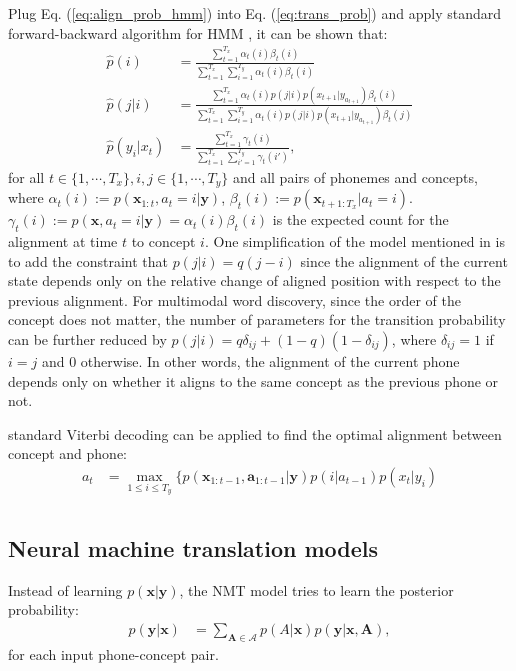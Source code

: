 \documentclass[journal]{IEEEtran}
\begin{document}
Plug Eq. (\ref{eq:align_prob_hmm}) into Eq. (\ref{eq:trans_prob}) and apply standard forward-backward algorithm for HMM \cite{Rabiner89-ATO}, it can be shown that:
\begin{align}
\label{eq:dhmm_em_update}
    \hat p(i) &= \frac{\sum_{t=1}^{T_x}\alpha_t(i)\beta_t(i)}{\sum_{t=1}^{T_x}\sum_{i=1}^{T_y}\alpha_t(i)\beta_t(i)}\\
    \hat p(j|i) &=  \frac{\sum_{t=1}^{T_x}\alpha_t(i)p(j|i)p(x_{t+1}|y_{a_{t+1}})\beta_t(i)}{\sum_{t=1}^{T_x}\sum_{i=1}^{T_y}\alpha_t(i)p(j|i)p(x_{t+1}|y_{a_{t+1}})\beta_t(j)}\\
    \hat p(y_i| x_t) &= \frac{\sum_{t=1}^{T_x}\gamma_t(i)}{\sum_{t=1}^{T_x}\sum_{i'=1}^{T_y}\gamma_t(i')},
\end{align}
for all $t \in \{1, \cdots, T_x\}, i, j \in \{1, \cdots, T_y\}$ and all pairs of phonemes and concepts, where $\alpha_t(i) := p(\mathbf x_{1:t}, a_t=i|\mathbf y)$, $\beta_t(i) := p(\mathbf x_{t+1:T_x}| a_t=i)$. $\gamma_t(i) := p(\mathbf x, a_t=i|\mathbf y) = \alpha_t(i) \beta_t(i)$ is the expected count for the alignment at time $t$ to concept $i$. One simplification of the model mentioned in \cite{Vogel1996} is to add the constraint that $p(j|i) = q(j-i)$ since the alignment of the current state depends only on the relative change of aligned position with respect to the previous alignment. For multimodal word discovery, since the order of the concept does not matter, the number of parameters for the transition probability can be further reduced by $p(j|i) = q \delta_{ij} + (1-q)(1-\delta_{ij})$, where $\delta_{ij} = 1$ if $i=j$ and 0 otherwise. In other words, the alignment of the current phone depends only on whether it aligns to the same concept as the previous phone or not. 

standard Viterbi decoding can be applied to find the optimal alignment between concept and phone: 
\begin{align*}
    a_t &= \max_{1 \leq i \leq T_y}\{p(\mathbf x_{1:t-1}, \mathbf a_{1:t-1}|\mathbf y) p(i|a_{t-1})p(x_t|y_i)\\
\end{align*}

\subsection{Neural machine translation models}
Instead of learning $p(\mathbf x|\mathbf y)$, the NMT model tries to learn the posterior probability:
\begin{align}\label{eq:nmt_trans_prob}
    p(\mathbf y|\mathbf x) &= \sum_{\mathbf A \in \mathcal A} p(A|\mathbf x) p(\mathbf y|\mathbf x, \mathbf A),
\end{align}
for each input phone-concept pair. 
\end{document}
